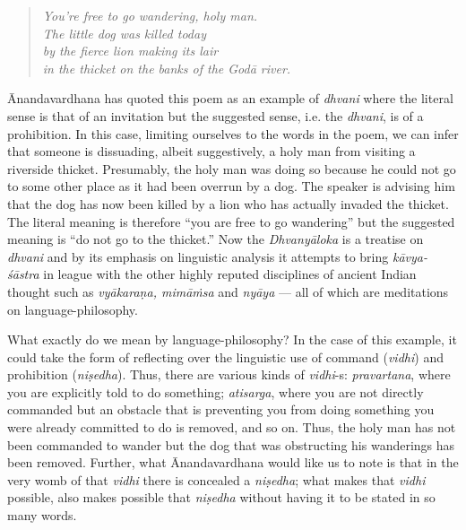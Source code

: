 \begin{quote}
{\sl You’re free to go wandering, holy man.}\\
{\sl The little dog was killed today}\\
{\sl by the fierce lion making its lair}\\
{\sl in the thicket on the banks of the Godā river.}
\end{quote}

Ānandavardhana has quoted this poem as an example of {\sl dhvani} where the literal sense is that of an invitation but the suggested sense, i.e. the {\sl dhvani}, is of a prohibition. In this case, limiting ourselves to the words in the poem, we can infer that someone is dissuading, albeit suggestively, a holy man from visiting a riverside thicket. Presumably, the holy man was doing so because he could not go to some other place as it had been overrun by a dog. The speaker is advising him that the dog has now been killed by a lion who has actually invaded the thicket. The literal meaning is therefore ``you are free to go wandering'' but the suggested meaning is ``do not go to the thicket.'' Now the {\sl Dhvanyāloka} is a treatise on {\sl dhvani} and by its emphasis on linguistic analysis it attempts to bring {\sl kāvya-śāstra} in league with the other highly reputed disciplines of ancient Indian thought such as {\sl vyākaraṇa, mimāṁsa} and {\sl nyāya} --- all of which are meditations on language-philosophy.

What exactly do we mean by language-philosophy? In the case of this example, it could take the form of reflecting over the linguistic use of command ({\sl vidhi}) and prohibition ({\sl niṣedha}). Thus, there are various kinds of {\sl vidhi}-s: {\sl pravartana}, where you are explicitly told to do something; {\sl atisarga}, where you are not directly commanded but an obstacle that is preventing you from doing something you were already committed to do is removed, and so on. Thus, the holy man has not been commanded to wander but the dog that was obstructing his wanderings has been removed. Further, what Ānandavardhana would like us to note is that in the very womb of that {\sl vidhi} there is concealed a {\sl niṣedha}; what makes that {\sl vidhi} possible, also makes possible that {\sl niṣedha} without having it to be stated in so many words.                

